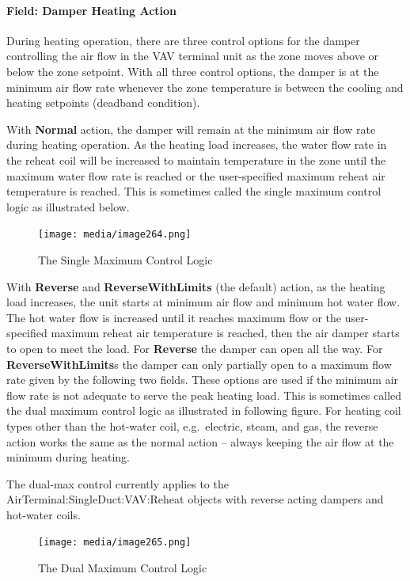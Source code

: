 \paragraph{Field: Damper Heating Action}\label{field-damper-heating-action}

During heating operation, there are three control options for the damper controlling the air flow in the VAV terminal unit as the zone moves above or below the zone setpoint. With all three control options, the damper is at the minimum air flow rate whenever the zone temperature is between the cooling and heating setpoints (deadband condition).

With \textbf{Normal} action, the damper will remain at the minimum air flow rate during heating operation. As the heating load increases, the water flow rate in the reheat coil will be increased to maintain temperature in the zone until the maximum water flow rate is reached or the user-specified maximum reheat air temperature is reached. This is sometimes called the single maximum control logic as illustrated below.

\begin{figure}[hbtp] %
\centering
\texttt{[image: media/image264.png]}
\caption{The Single Maximum Control Logic \protect \label{fig:the-single-maximum-control-logic}}
\end{figure}

With \textbf{Reverse} and \textbf{ReverseWithLimits} (the default) action, as the heating load increases, the unit starts at minimum air flow and minimum hot water flow. The hot water flow is increased until it reaches maximum flow or the user-specified maximum reheat air temperature is reached, then the air damper starts to open to meet the load. For \textbf{Reverse} the damper can open all the way. For \textbf{ReverseWithLimits}s the damper can only partially open to a maximum flow rate given by the following two fields. These options are used if the minimum air flow rate is not adequate to serve the peak heating load. This is sometimes called the dual maximum control logic as illustrated in following figure. For heating coil types other than the hot-water coil, e.g.~electric, steam, and gas, the reverse action works the same as the normal action -- always keeping the air flow at the minimum during heating.

The dual-max control currently applies to the AirTerminal:SingleDuct:VAV:Reheat objects with reverse acting dampers and hot-water coils.

\begin{figure}[hbtp] %
\centering
\texttt{[image: media/image265.png]}
\caption{  The Dual Maximum Control Logic \protect \label{fig:the-dual-maximum-control-logic}}
\end{figure}

